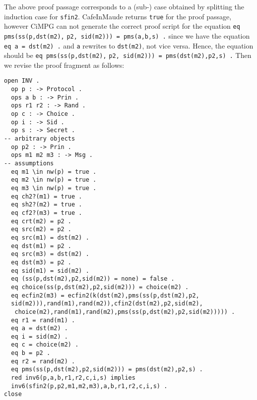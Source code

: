 \documentclass[a4paper,fleqn]{cas-dc}
\begin{document}
The above proof passage corresponds to a (sub-) case obtained by splitting the induction case for \verb!sfin2!. CafeInMaude returns \verb!true! for the proof passage, however CiMPG can not generate the correct proof script for the equation 
\verb!eq pms(ss(p,dst(m2),! \verb!p2, sid(m2))) = pms(a,b,s) .!
since we have the equation \verb!eq a = dst(m2) .! and \verb!a! rewrites to \verb!dst(m2)!, not vice versa. Hence, the equation should be \verb!eq pms(ss(p,dst(m2),! \verb!p2, sid(m2))) = pms(dst(m2),p2,s) .! Then we revise the proof fragment as follows:
\begin{small}
\begin{verbatim}
open INV .
  op p : -> Protocol .
  ops a b : -> Prin .
  ops r1 r2 : -> Rand .
  op c : -> Choice .
  op i : -> Sid .
  op s : -> Secret .
-- arbitrary objects
  op p2 : -> Prin .
  ops m1 m2 m3 : -> Msg .
-- assumptions
  eq m1 \in nw(p) = true .
  eq m2 \in nw(p) = true .
  eq m3 \in nw(p) = true .
  eq ch2?(m1) = true .
  eq sh2?(m2) = true .
  eq cf2?(m3) = true .
  eq crt(m2) = p2 .
  eq src(m2) = p2 .
  eq src(m1) = dst(m2) .
  eq dst(m1) = p2 .
  eq src(m3) = dst(m2) .
  eq dst(m3) = p2 .
  eq sid(m1) = sid(m2) .
  eq (ss(p,dst(m2),p2,sid(m2)) = none) = false .
  eq choice(ss(p,dst(m2),p2,sid(m2))) = choice(m2) .
  eq ecfin2(m3) = ecfin2(k(dst(m2),pms(ss(p,dst(m2),p2,
  sid(m2))),rand(m1),rand(m2)),cfin2(dst(m2),p2,sid(m2),
   choice(m2),rand(m1),rand(m2),pms(ss(p,dst(m2),p2,sid(m2))))) .
  eq r1 = rand(m1) .
  eq a = dst(m2) .
  eq i = sid(m2) .
  eq c = choice(m2) .
  eq b = p2 .
  eq r2 = rand(m2) .
  eq pms(ss(p,dst(m2),p2,sid(m2))) = pms(dst(m2),p2,s) .
  red inv6(p,a,b,r1,r2,c,i,s) implies
  inv6(sfin2(p,p2,m1,m2,m3),a,b,r1,r2,c,i,s) .
close
\end{verbatim}
\end{small}
\end{document}
